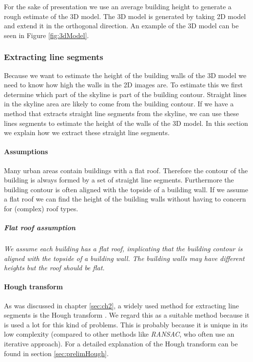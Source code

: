 For the sake of presentation we use an average building height to generate a
rough estimate of the 3D model.  The 3D model is generated by taking 2D model
and extend it in the orthogonal direction.  An example of the 3D model can
be seen in Figure \ref{fig:3dModel}.





\subsubsection{Extracting line segments}
\label{extractinglinesegments}
	Because we want to estimate the height of the building walls of the 3D model we
	need to know how high the walls in the 2D images are.  To estimate this we
	first determine which part of the skyline is part of the building contour.
	Straight lines in the skyline area are likely to come from the building
	contour.  If we have a method that extracts straight line segments from the
	skyline, we can use these lines segments to estimate the height of the walls
	of the 3D model.  In this section we explain how we extract these straight
	line segments.  \\

\paragraph{Assumptions}
	Many urban areas contain buildings with a flat roof. Therefore the contour
	of the building is always formed by a set of straight line segments.
	Furthermore the building contour is often aligned with the topside of a building wall.
	If we assume a flat roof we can find the height of
	the building walls without having to concern for (complex) roof types.

	\subparagraph{Flat roof assumption}
	\emph{We assume each building has a flat roof, implicating that the building
	contour is aligned with the topside of a building wall.  The building walls
	may have different heights but the roof should be flat.}\\


\paragraph{Hough transform}
	As was discussed in chapter \ref{sec:ch2}, a widely used method for extracting line segments is the Hough transform \cite{Hough}.
	We regard this as a suitable method because it is
	used a lot for this kind of problems. This is probably because it is unique
	in its low complexity (compared to other methods like
	\emph{RANSAC}, who often use an iterative approach).
	For a detailed explanation of the Hough transform can be found in section
	\ref{sec:prelimHough}.\\

